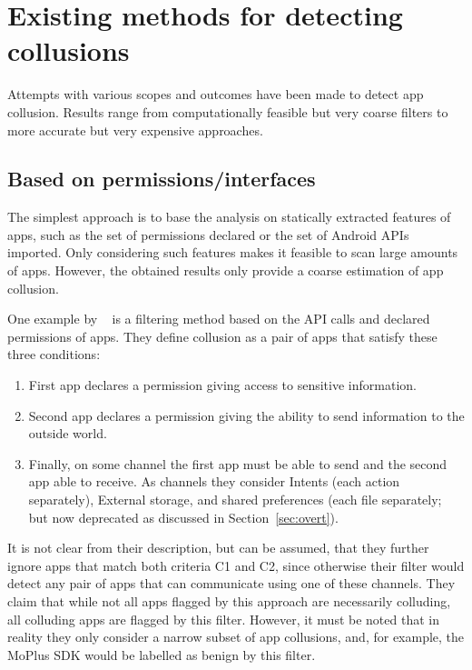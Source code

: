 \documentclass[article]{aaltoseries}
\newcommand{\Sref}[1]{Section~\ref{#1}}
\begin{document}
\section{Existing methods for detecting collusions}
\label{sec:approaches}

Attempts with various scopes and outcomes have been made to detect app collusion. Results range from computationally feasible but very coarse filters to more accurate but very expensive approaches.

\subsection{Based on permissions/interfaces}
\label{sec:filter}

The simplest approach is to base the analysis on statically extracted features of apps, such as the set of permissions declared or the set of Android APIs imported. Only considering such features makes it feasible to scan large amounts of apps. However, the obtained results only provide a coarse estimation of app collusion.

One example by \citeauthor{Asavoae2016}~\cite{Asavoae2016} is a filtering method based on the API calls and declared permissions of apps. They define collusion as a pair of apps that satisfy these three conditions:
\begin{enumerate}[label={C\arabic*}]
	\item First app declares a permission giving access to sensitive information.
	\item Second app declares a permission giving the ability to send information to the outside world.
	\item Finally, on some channel the first app must be able to send and the second app able to receive. As channels they consider Intents (each action separately), External storage, and shared preferences (each file separately; but now deprecated as discussed in \Sref{sec:overt}).
\end{enumerate}
It is not clear from their description, but can be assumed, that they further ignore apps that match both criteria C1 and C2, since otherwise their filter would detect any pair of apps that can communicate using one of these channels. They claim that while not all apps flagged by this approach are necessarily colluding, all colluding apps are flagged by this filter. However, it must be noted that in reality they only consider a narrow subset of app collusions, and, for example, the MoPlus SDK would be labelled as benign by this filter.
\end{document}
